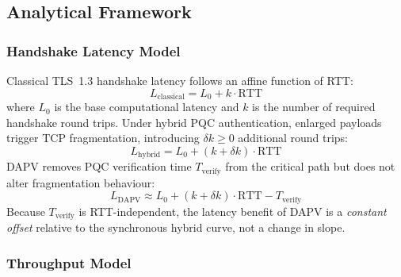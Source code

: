 \documentclass[preprint,10pt,3p]{elsarticle}
\begin{document}
%   


\subsection{Analytical Framework}
\label{sec:analytical}

\subsubsection{Handshake Latency Model}

Classical TLS~1.3 handshake latency follows an affine function of RTT:
\begin{equation}
  L_\text{classical} = L_0 + k \cdot \text{RTT}
  \label{eq:classical}
\end{equation}
where $L_0$ is the base computational latency and $k$ is the number of
required handshake round trips.  Under hybrid PQC authentication, enlarged
payloads trigger TCP fragmentation, introducing $\delta k \geq 0$ additional
round trips:
\begin{equation}
  L_\text{hybrid} = L_0 + (k + \delta k) \cdot \text{RTT}
  \label{eq:hybrid}
\end{equation}
DAPV removes PQC verification time $T_\text{verify}$ from the critical path
but does not alter fragmentation behaviour:
\begin{equation}
  L_\text{DAPV} \approx L_0 + (k + \delta k) \cdot \text{RTT} - T_\text{verify}
  \label{eq:dapv}
\end{equation}
Because $T_\text{verify}$ is RTT-independent, the latency benefit of DAPV is a
\emph{constant offset} relative to the synchronous hybrid curve, not a change
in slope.

\subsubsection{Throughput Model}
\end{document}
